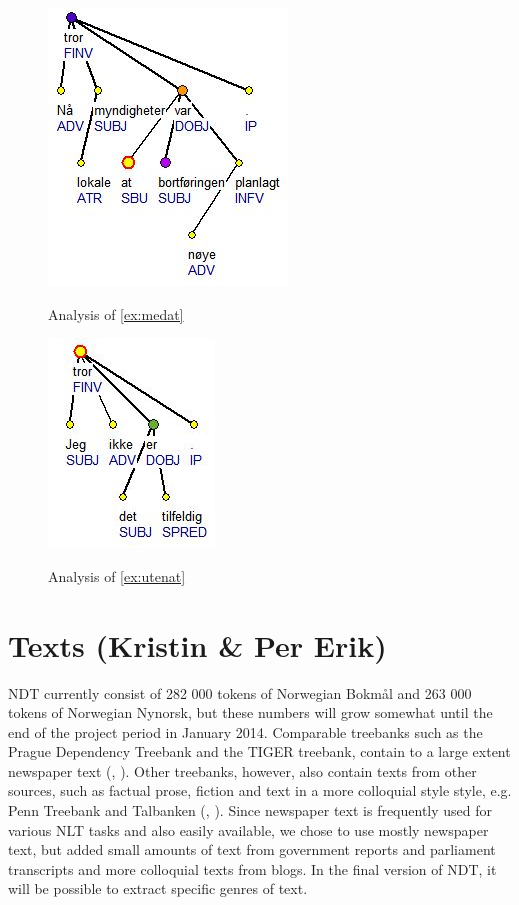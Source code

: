 \documentclass[11pt,a4paper]{article}
\begin{document}
\begin{figure}[h!]
  \caption{Analysis of \ref{ex:medat}}
  \centering
    \includegraphics{medat.jpg}
\label{figure:medat}
\end{figure}

\begin{figure}[h!]
  \caption{Analysis of \ref{ex:utenat}}
  \centering
    \includegraphics{utenat.jpg}
\label{figure:utenat}
\end{figure}


\section{Texts (Kristin \& Per Erik)}
NDT currently consist of 282 000 tokens of Norwegian Bokmål and 263 000 tokens of Norwegian Nynorsk, but these numbers will grow somewhat until the end of the project period in January 2014. Comparable treebanks such as the Prague Dependency Treebank and the TIGER treebank, contain to a large extent newspaper text (\cite{Boh:Haj:Hla:2003}, \cite{Bra:2004}). Other treebanks, however, also contain texts from other sources, such as factual prose, fiction and text in a more colloquial style style, e.g. Penn Treebank and Talbanken (\cite{Mar:San:Mar:09}, \cite{Niv:Nil:Hal:2006}). Since newspaper text is frequently used for various NLT tasks and also easily available, we chose to use mostly newspaper text, but added small amounts of text from government reports and parliament transcripts and more colloquial texts from blogs. In the final version of NDT, it will be possible to extract specific genres of text.
\end{document}
